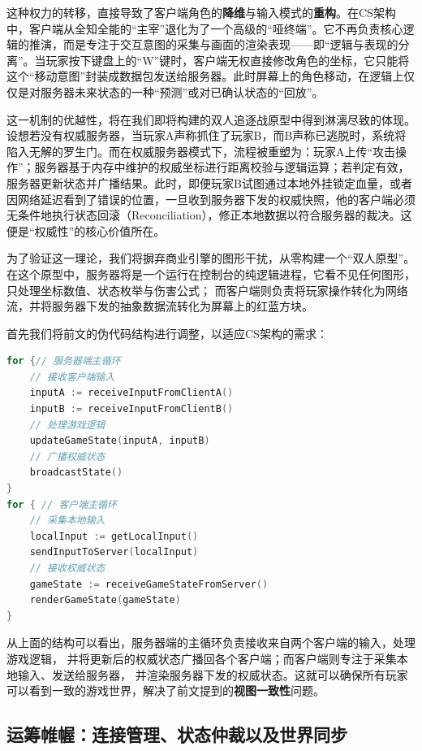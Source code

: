这种权力的转移，直接导致了客户端角色的\textbf{降维}与输入模式的\textbf{重构}。在CS架构中，客户端从全知全能的“主宰”退化为了一个高级的“哑终端”。它不再负责核心逻辑的推演，而是专注于交互意图的采集与画面的渲染表现——即“逻辑与表现的分离”。当玩家按下键盘上的“W”键时，客户端无权直接修改角色的坐标，它只能将这个“移动意图”封装成数据包发送给服务器。此时屏幕上的角色移动，在逻辑上仅仅是对服务器未来状态的一种“预测”或对已确认状态的“回放”。

这一机制的优越性，将在我们即将构建的双人追逐战原型中得到淋漓尽致的体现。设想若没有权威服务器，当玩家A声称抓住了玩家B，而B声称已逃脱时，系统将陷入无解的罗生门。而在权威服务器模式下，流程被重塑为：玩家A上传“攻击操作”；服务器基于内存中维护的权威坐标进行距离校验与逻辑运算；若判定有效，服务器更新状态并广播结果。此时，即便玩家B试图通过本地外挂锁定血量，或者因网络延迟看到了错误的位置，一旦收到服务器下发的权威快照，他的客户端必须无条件地执行状态回滚（Reconciliation），修正本地数据以符合服务器的裁决。这便是“权威性”的核心价值所在。

为了验证这一理论，我们将摒弃商业引擎的图形干扰，从零构建一个“双人原型”。
在这个原型中，服务器将是一个运行在控制台的纯逻辑进程，它看不见任何图形，只处理坐标数值、状态枚举与伤害公式；
而客户端则负责将玩家操作转化为网络流，并将服务器下发的抽象数据流转化为屏幕上的红蓝方块。

首先我们将前文的伪代码结构进行调整，以适应CS架构的需求：
\begin{tcolorbox}[title=CS架构伪代码结构,label=code:cs_structure]
\begin{lstlisting}[style=codeblock, language=go]
for {// 服务器端主循环
    // 接收客户端输入
    inputA := receiveInputFromClientA()
    inputB := receiveInputFromClientB()
    // 处理游戏逻辑
    updateGameState(inputA, inputB)
    // 广播权威状态
    broadcastState()
}
for { // 客户端主循环
    // 采集本地输入
    localInput := getLocalInput()
    sendInputToServer(localInput)
    // 接收权威状态
    gameState := receiveGameStateFromServer()
    renderGameState(gameState)
}
\end{lstlisting}
\end{tcolorbox}

从上面的结构可以看出，服务器端的主循环负责接收来自两个客户端的输入，处理游戏逻辑，
并将更新后的权威状态广播回各个客户端；而客户端则专注于采集本地输入、发送给服务器，
并渲染服务器下发的权威状态。这就可以确保所有玩家可以看到一致的游戏世界，解决了前文提到的\textbf{视图一致性}问题。



\subsection{运筹帷幄：连接管理、状态仲裁以及世界同步}


